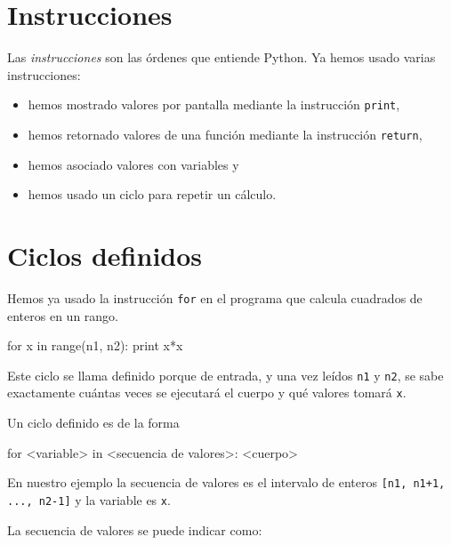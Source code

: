 \section{Instrucciones}

Las {\it instrucciones} son las órdenes que entiende Python. Ya
hemos usado varias instrucciones:

\begin{itemize}

\item hemos mostrado valores por pantalla mediante la instrucción
\lstinline!print!,

\item hemos retornado valores de una función mediante la
instrucción \lstinline!return!,

\item hemos asociado valores con variables y

\item hemos usado un ciclo para repetir un cálculo.
\end{itemize}

\section{Ciclos definidos}
\label{ciclosdef}
Hemos ya usado la instrucción \lstinline!for! en el programa que calcula
cuadrados de enteros en un rango. 

\begin{codigo-python-sn}
    for x in range(n1, n2):
        print x*x
\end{codigo-python-sn}

Este ciclo se llama definido porque de entrada, y una vez leídos 
\lstinline!n1! y \lstinline!n2!, se sabe exactamente cuántas veces se ejecutará
el cuerpo y qué valores tomará \lstinline!x!.

Un ciclo definido es de la forma

\begin{codigo-python-sn}
for <variable> in <secuencia de valores>:
    <cuerpo>
\end{codigo-python-sn}

En nuestro ejemplo la secuencia de valores es el intervalo de
enteros \lstinline![n1, n1+1, ..., n2-1]! y la variable es \lstinline!x!.

La secuencia de valores se puede indicar como:

